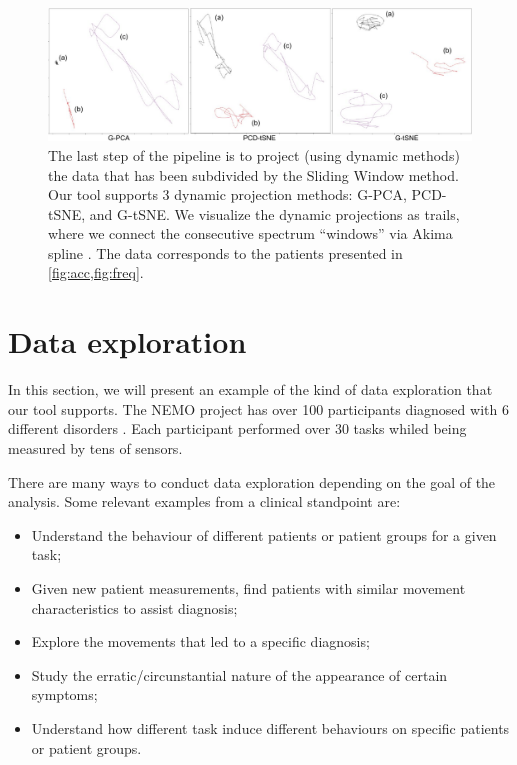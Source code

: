 \begin{figure}[ht]
\centering
\includegraphics[width=\linewidth]{figures/nemo/nemo1-projections.pdf}
\caption{The last step of the pipeline is to project (using dynamic methods) the data that has been subdivided by the Sliding Window method. Our tool supports 3 dynamic projection methods: G-PCA, PCD-tSNE, and  G-tSNE. We visualize the dynamic projections as trails, where we connect the consecutive spectrum ``windows'' via Akima spline . The data corresponds to the patients presented in \cref{fig:acc,fig:freq}.}
\label{fig:nemo1-projections}
\end{figure}

\section{Data exploration}

In this section, we will present an example of the kind of data exploration that our tool supports. The NEMO project has over 100 participants diagnosed with 6 different disorders . Each participant performed over 30 tasks whiled being measured by tens of sensors.

There are many ways to conduct data exploration depending on the goal of the analysis. Some relevant examples from a clinical standpoint are:
\begin{itemize}
    \item Understand the behaviour of different patients or patient groups for a given task; 
    \item Given new patient measurements, find patients with similar movement characteristics to assist diagnosis;
    \item Explore the movements that led to a specific diagnosis;
    \item Study the erratic/circunstantial nature of the appearance of certain symptoms;
    \item Understand how different task induce different behaviours on specific patients or patient groups. 
\end{itemize}

